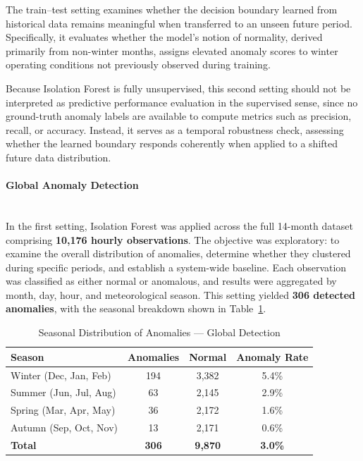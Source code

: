 \documentclass{article}
\begin{document}
The train--test setting examines whether the decision boundary learned
from historical data remains meaningful when transferred to an unseen
future period. Specifically, it evaluates whether the model's notion of
normality, derived primarily from non-winter months, assigns elevated
anomaly scores to winter operating conditions not previously observed
during training.

Because Isolation Forest is fully unsupervised, this second setting
should not be interpreted as predictive performance evaluation in the
supervised sense, since no ground-truth anomaly labels are available to
compute metrics such as precision, recall, or accuracy. Instead, it
serves as a temporal robustness check, assessing whether the learned
boundary responds coherently when applied to a shifted future data
distribution.

\paragraph{Global Anomaly Detection}\mbox{}\\
In the first setting, Isolation Forest was applied across the full
14-month dataset comprising \textbf{10,176 hourly observations}. The
objective was exploratory: to examine the overall distribution of
anomalies, determine whether they clustered during specific periods,
and establish a system-wide baseline. Each observation was classified
as either normal or anomalous, and results were aggregated by month,
day, hour, and meteorological season. This setting yielded
\textbf{306 detected anomalies}, with the seasonal breakdown shown in
Table~\ref{tab:seasonal}.

\begin{table}[h]
\centering
\caption{Seasonal Distribution of Anomalies --- Global Detection}
\label{tab:seasonal}
\begin{tabular}{lccc}
\hline
\textbf{Season} & \textbf{Anomalies} & \textbf{Normal} & \textbf{Anomaly Rate} \\
\hline
Winter   (Dec, Jan, Feb) & 194 & 3{,}382 & 5.4\% \\
Summer   (Jun, Jul, Aug) &  63 & 2{,}145 & 2.9\% \\
Spring   (Mar, Apr, May) &  36 & 2{,}172 & 1.6\% \\
Autumn   (Sep, Oct, Nov) &  13 & 2{,}171 & 0.6\% \\
\hline
\textbf{Total} & \textbf{306} & \textbf{9{,}870} & \textbf{3.0\%} \\
\hline
\end{tabular}
\end{table}
\end{document}
